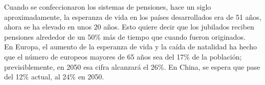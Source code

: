 \vspace{-0.3cm}
\noindent \textbf{\checkmark}  Cuando se confeccionaron los sistemas de pensiones, hace un siglo aproximadamente, la esperanza de vida en los pa\'ises desarrollados era de 51 a\~nos, ahora se ha elevado en unos 20 a\~nos. Esto quiere decir que los jubilados reciben pensiones alrededor de un 50\% m\'as de tiempo que cuando fueron originados. \\

\vspace{-0.3cm}
\noindent \textbf{\checkmark}  En Europa, el aumento de la esperanza de vida y la ca\'ida de natalidad ha hecho que el n\'umero de europeos mayores de 65 a\~nos sea del 17\% de la poblaci\'on; previsiblemente, en 2050 esa cifra alcanzar\'a el 26\%. En China, se espera que pase del 12\% actual, al 24\% en 2050.

